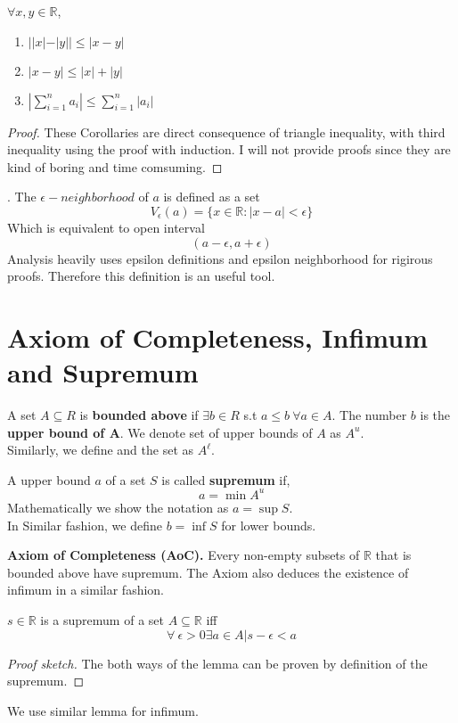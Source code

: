 \begin{corollary} $\forall x,y \in \mathbb{R}$,
    \begin{enumerate}
        \item $ ||x| - |y|| \le |x-y|$
        \item $|x-y| \le |x| + |y|$
        \item $ \left| \sum_{i=1}^n a_i \right| \le  \sum_{i=1}^n |a_i|$
    \end{enumerate}
    \begin{proof}
        These Corollaries are direct consequence of triangle inequality, with third inequality using the proof with induction. I will not provide proofs since they are kind of boring and time comsuming.
    \end{proof}
\end{corollary}
\begin{definition}. The $\epsilon-neighborhood$ of $a$ is defined as a set 
    \[ V_{\epsilon}(a) = \{ x \in \mathbb{R} : |x-a| < \epsilon\}\]
    Which is equivalent to open interval
    \[ (a - \epsilon, a+ \epsilon)\]
    Analysis heavily uses epsilon definitions and epsilon neighborhood for rigirous proofs. Therefore this definition is an useful tool.
\end{definition}
\section{Axiom of Completeness, Infimum and Supremum}
\begin{definition}
    A set $A \subseteq R$ is \textbf{bounded above} if $\exists b \in R$ s.t $ a \le b \ \forall a \in A$. The number $b$ is the \textbf{upper bound of  A}. We denote set of upper bounds of $A$ as $A^u$. \\
    Similarly, we define  and the set as $A^{\ell}$.
\end{definition}

\begin{definition} A upper bound $a$ of a set $S$ is called \textbf{supremum} if,
    \[ a = \min A^{u}\]
Mathematically we show the notation as $a = \sup S$.\\ 
In Similar fashion, we define $b = \inf S$ for lower bounds.
\end{definition}
\vspace{6mm}
\textbf{Axiom of Completeness (AoC).} Every non-empty subsets of $\mathbb{R}$ that is bounded above have supremum. The Axiom also deduces the existence of infimum in a similar fashion.\\
\begin{lemma}
    $s \in \mathbb{R}$ is a supremum of a set $A \subseteq \mathbb{R}$ iff 
    \[ \forall \ \epsilon > 0  \exists  a \in A  |   s - \epsilon < a\] 
    \begin{proof}[Proof sketch] The both ways of the lemma can be proven by definition of the supremum.
    \end{proof}
    We use similar lemma for infimum.\\
\end{lemma}


